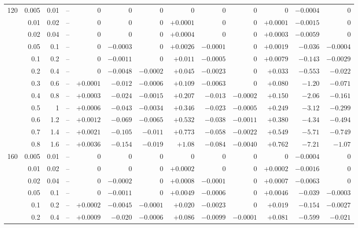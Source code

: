 \documentclass[11pt,a4paper]{article}
\begin{document}
\begin{table}[htbp]
\begin{tabular}{rrrrrrrrrrrrr}
\midrule
120 & 0.005 & 0.01 & -- & $0$ & $0$ & $0$ & $0$ & $0$ & $0$ & $0$ & $-0.0004$ & $0$ \\
 & 0.01 & 0.02 & -- & $0$ & $0$ & $0$ & $+0.0001$ & $0$ & $0$ & $+0.0001$ & $-0.0015$ & $0$ \\
 & 0.02 & 0.04 & -- & $0$ & $0$ & $0$ & $+0.0004$ & $0$ & $0$ & $+0.0003$ & $-0.0059$ & $0$ \\
 & 0.05 & 0.1 & -- & $0$ & $-0.0003$ & $0$ & $+0.0026$ & $-0.0001$ & $0$ & $+0.0019$ & $-0.036$ & $-0.0004$ \\
 & 0.1 & 0.2 & -- & $0$ & $-0.0011$ & $0$ & $+0.011$ & $-0.0005$ & $0$ & $+0.0079$ & $-0.143$ & $-0.0029$ \\
 & 0.2 & 0.4 & -- & $0$ & $-0.0048$ & $-0.0002$ & $+0.045$ & $-0.0023$ & $0$ & $+0.033$ & $-0.553$ & $-0.022$ \\
 & 0.3 & 0.6 & -- & $+0.0001$ & $-0.012$ & $-0.0006$ & $+0.109$ & $-0.0063$ & $0$ & $+0.080$ & $-1.20$ & $-0.071$ \\
 & 0.4 & 0.8 & -- & $+0.0003$ & $-0.024$ & $-0.0015$ & $+0.207$ & $-0.013$ & $-0.0002$ & $+0.150$ & $-2.06$ & $-0.161$ \\
 & 0.5 & 1 & -- & $+0.0006$ & $-0.043$ & $-0.0034$ & $+0.346$ & $-0.023$ & $-0.0005$ & $+0.249$ & $-3.12$ & $-0.299$ \\
 & 0.6 & 1.2 & -- & $+0.0012$ & $-0.069$ & $-0.0065$ & $+0.532$ & $-0.038$ & $-0.0011$ & $+0.380$ & $-4.34$ & $-0.494$ \\
 & 0.7 & 1.4 & -- & $+0.0021$ & $-0.105$ & $-0.011$ & $+0.773$ & $-0.058$ & $-0.0022$ & $+0.549$ & $-5.71$ & $-0.749$ \\
 & 0.8 & 1.6 & -- & $+0.0036$ & $-0.154$ & $-0.019$ & $+1.08$ & $-0.084$ & $-0.0040$ & $+0.762$ & $-7.21$ & $-1.07$ \\
\midrule
160 & 0.005 & 0.01 & -- & $0$ & $0$ & $0$ & $0$ & $0$ & $0$ & $0$ & $-0.0004$ & $0$ \\
 & 0.01 & 0.02 & -- & $0$ & $0$ & $0$ & $+0.0002$ & $0$ & $0$ & $+0.0002$ & $-0.0016$ & $0$ \\
 & 0.02 & 0.04 & -- & $0$ & $-0.0002$ & $0$ & $+0.0008$ & $-0.0001$ & $0$ & $+0.0007$ & $-0.0063$ & $0$ \\
 & 0.05 & 0.1 & -- & $0$ & $-0.0011$ & $0$ & $+0.0049$ & $-0.0006$ & $0$ & $+0.0046$ & $-0.039$ & $-0.0003$ \\
 & 0.1 & 0.2 & -- & $+0.0002$ & $-0.0045$ & $-0.0001$ & $+0.020$ & $-0.0023$ & $0$ & $+0.019$ & $-0.154$ & $-0.0027$ \\
 & 0.2 & 0.4 & -- & $+0.0009$ & $-0.020$ & $-0.0006$ & $+0.086$ & $-0.0099$ & $-0.0001$ & $+0.081$ & $-0.599$ & $-0.021$ \\

\end{tabular}
\end{table}
\end{document}
